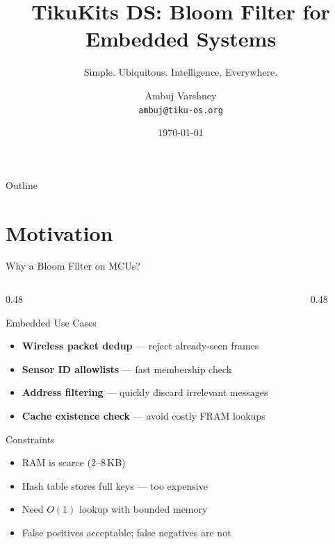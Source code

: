 \documentclass[aspectratio=169, 10pt]{beamer}
\title[TikuKits DS]{TikuKits DS: Bloom Filter for Embedded Systems}
\subtitle{Simple. Ubiquitous. Intelligence, Everywhere.}
\author[Ambuj Varshney]{Ambuj Varshney \\ \texttt{ambuj@tiku-os.org}}
\date{\today}
\begin{document}
\begin{frame}
\titlepage
\end{frame}

\begin{frame}{Outline}
\tableofcontents
\end{frame}

\section{Motivation}

\begin{frame}{Why a Bloom Filter on MCUs?}
\begin{columns}[T]
\begin{column}{0.48\textwidth}
\begin{block}{Embedded Use Cases}
\begin{itemize}
  \item \textbf{Wireless packet dedup} --- reject already-seen frames
  \item \textbf{Sensor ID allowlists} --- fast membership check
  \item \textbf{Address filtering} --- quickly discard irrelevant messages
  \item \textbf{Cache existence check} --- avoid costly FRAM lookups
\end{itemize}
\end{block}

\begin{block}{Constraints}
\begin{itemize}
  \item RAM is scarce (2--8\,KB)
  \item Hash table stores full keys --- too expensive
  \item Need $O(1)$ lookup with bounded memory
  \item False positives acceptable; false negatives are not
\end{itemize}
\end{block}
\end{column}

\begin{column}{0.48\textwidth}
\begin{center}
\end{center}
\end{column}
\end{columns}
\end{frame}
\end{document}
